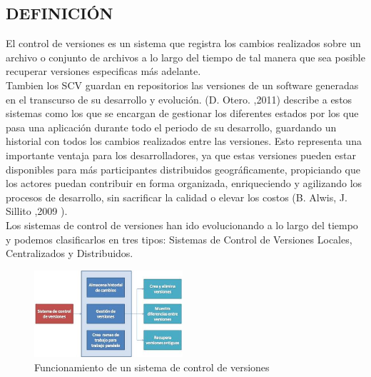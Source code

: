 \documentclass[a4paper,12pt]{article}
\begin{document}
{\subsection{DEFINICIÓN}

El control de versiones es un sistema que registra los cambios realizados sobre un archivo o conjunto de archivos a lo largo del tiempo de tal manera que sea posible recuperar versiones especificas más adelante.
\\
Tambien los SCV guardan en repositorios las versiones de un software generadas en el transcurso de su desarrollo y evolución. (D. Otero. ,2011) describe a estos sistemas como los que se encargan de gestionar los diferentes estados por los que pasa una aplicación durante todo el periodo de su desarrollo, guardando un historial con todos los cambios realizados entre las versiones. Esto representa una importante ventaja para los desarrolladores, ya que estas versiones pueden estar disponibles para más participantes distribuidos geográficamente, propiciando que los actores puedan contribuir en forma organizada, enriqueciendo y agilizando los procesos de desarrollo, sin sacrificar la calidad o elevar los costos (B. Alwis,  J. Sillito ,2009 ).
\\
Los sistemas de control de versiones han ido evolucionando a lo largo del tiempo y podemos clasificarlos en tres tipos: Sistemas de Control de Versiones Locales, Centralizados y Distribuidos.
\\

\begin{figure}[h]
	\centering
	\begin{minipage}[t]{5.5cm}
		\includegraphics[width=5.5cm]{grafico1.png}	 %
		\caption{ Funcionamiento de un sistema de control de	versiones}		
	\end{minipage}
	
\end{figure}

}
\end{document}
